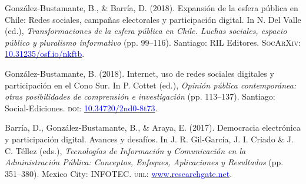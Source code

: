\begin{publications}
\begin{benumerate}{12}
\item{González-Bustamante, B., \& Barría, D. (2018). Expansión de la esfera pública en Chile: Redes sociales, campañas electorales y participación digital. In N. Del Valle (ed.), {\itshape Transformaciones de la esfera pública en Chile. Luchas sociales, espacio público y pluralismo informativo} (pp. 99--116). Santiago: RIL Editores. {\scshape \footnotesize SocArXiv:} \href{https://doi.org/10.31235/osf.io/nkftb}{\textcolor{blue}{10.31235/osf.io/nkftb}}.}\vspace{1mm}


\item{González-Bustamante, B. (2018). Internet, uso de redes sociales digitales y participación en el Cono Sur. In P. Cottet (ed.), {\itshape Opinión pública contemporánea: otras posibilidades de comprensión e investigación} (pp. 113--137). Santiago: Social-Ediciones. {\scshape doi:} \href{https://doi.org/10.34720/2nd0-8t73}{\textcolor{blue}{10.34720/2nd0-8t73}}.}\vspace{1mm}


\item{Barría, D., González-Bustamante, B., \& Araya, E. (2017). Democracia electrónica y participación digital. Avances y desafíos. In J. R. Gil-García, J. I. Criado \&  J. C. Téllez (eds.), {\itshape Tecnologías de Información y Comunicación en la Administración P\'ublica: Conceptos, Enfoques, Aplicaciones y Resultados} (pp. 351--380). Mexico City: INFOTEC. {\scshape url:} \href{https://www.researchgate.net/publication/321980289_Democracia_electronica_y_participacion_digital_Avances_y_desafios}{\textcolor{blue}{www.researchgate.net}}.}\vspace{1mm}


\end{benumerate}
\end{publications}
